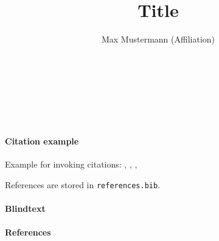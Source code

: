 \documentclass[
12pt,a4paper
]{article}
\author{Max Mustermann (Affiliation)}
\title{Title}
\makeatletter
\renewcommand\maketitle{
  ~\vspace{-1.1cm}\newline
  {\raggedright
    \renewcommand{\baselinestretch}{1.2}\selectfont
  {\bfseries\large\@title}\\[2ex]
  {\large\@author}\\[2ex]
  }
}
\makeatother
\begin{document}
\maketitle


\paragraph{Citation example}

Example for invoking citations: \cite{Bech:63}, \citet[291]{Bech:63}, \citep{Bech:63}, \citealt{Bech:63}

References are stored in \texttt{references.bib}.

\paragraph{Blindtext} \lipsum

\paragraph{References}
{\tiny
\printbibliography[heading=none]
}
\end{document}
